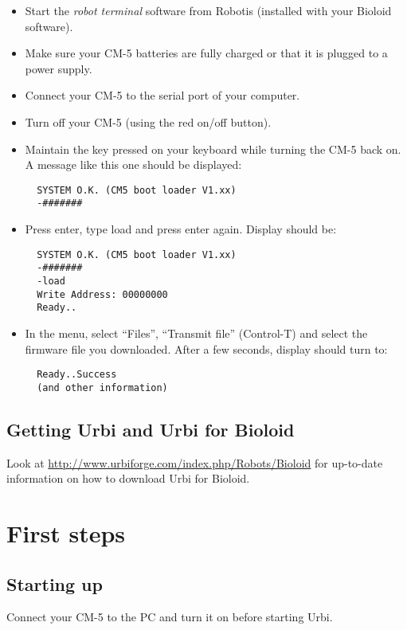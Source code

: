 \begin{itemize}
\item Start the \emph{robot terminal} software from Robotis (installed with
  your Bioloid software).
\item Make sure your CM-5 batteries are fully charged or that it is plugged
  to a power supply.
\item Connect your CM-5 to the serial port of your computer.
\item Turn off your CM-5 (using the red on/off button).
\item Maintain the \samp{\#} key pressed on your keyboard while turning the
  CM-5 back on. A message like this one should be displayed:

\begin{verbatim}
  SYSTEM O.K. (CM5 boot loader V1.xx)
  -#######
\end{verbatim}

\item Press enter, type load and press enter again. Display should be:
\begin{verbatim}
  SYSTEM O.K. (CM5 boot loader V1.xx)
  -#######
  -load
  Write Address: 00000000
  Ready..
\end{verbatim}

\item In the menu, select ``Files'', ``Transmit file'' (Control-T) and
  select the firmware file you downloaded. After a few seconds, display
  should turn to:
\begin{verbatim}
  Ready..Success
  (and other information)
\end{verbatim}
\end{itemize}

\subsection{Getting Urbi and Urbi for Bioloid}

Look at \url{http://www.urbiforge.com/index.php/Robots/Bioloid} for
up-to-date information on how to download Urbi for Bioloid.

\section{First steps}

\subsection{Starting up}
Connect your CM-5 to the PC and turn it on before starting Urbi.

